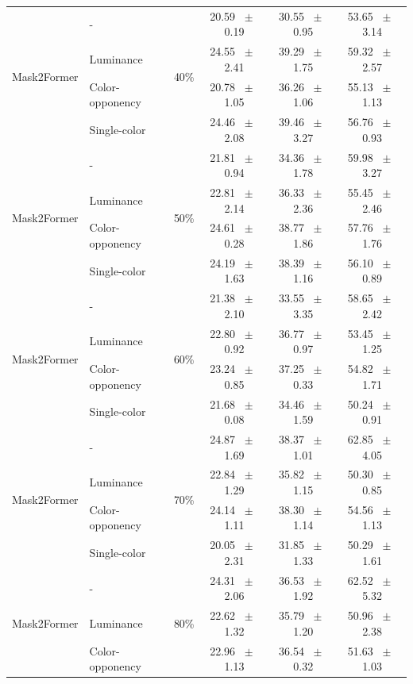 \begin{table}[h]
\begin{tabular}{@{}l l c c c c@{}}
    \multirow{4}{*}{Mask2Former} & - & \multirow{4}{*}{40\%} & 20.59 ~$\pm$~ 0.19 & 30.55 ~$\pm$~ 0.95 & 53.65 ~$\pm$~ 3.14 \\
    & Luminance &  & 24.55 ~$\pm$~ 2.41 & 39.29 ~$\pm$~ 1.75 & 59.32 ~$\pm$~ 2.57 \\
    & Color-opponency &  & 20.78 ~$\pm$~ 1.05 & 36.26 ~$\pm$~ 1.06 & 55.13 ~$\pm$~ 1.13 \\
    & Single-color &  & 24.46 ~$\pm$~ 2.08 & 39.46 ~$\pm$~ 3.27 & 56.76 ~$\pm$~ 0.93 \\
    \midrule
    \multirow{4}{*}{Mask2Former} & - & \multirow{4}{*}{50\%} & 21.81 ~$\pm$~ 0.94 & 34.36 ~$\pm$~ 1.78 & 59.98 ~$\pm$~ 3.27 \\
    & Luminance &  & 22.81 ~$\pm$~ 2.14 & 36.33 ~$\pm$~ 2.36 & 55.45 ~$\pm$~ 2.46 \\
    & Color-opponency &  & 24.61 ~$\pm$~ 0.28 & 38.77 ~$\pm$~ 1.86 & 57.76 ~$\pm$~ 1.76 \\
    & Single-color &  & 24.19 ~$\pm$~ 1.63 & 38.39 ~$\pm$~ 1.16 & 56.10 ~$\pm$~ 0.89 \\
    \midrule
    \multirow{4}{*}{Mask2Former} & - & \multirow{4}{*}{60\%} & 21.38 ~$\pm$~ 2.10 & 33.55 ~$\pm$~ 3.35 & 58.65 ~$\pm$~ 2.42 \\
    & Luminance &  & 22.80 ~$\pm$~ 0.92 & 36.77 ~$\pm$~ 0.97 & 53.45 ~$\pm$~ 1.25 \\
    & Color-opponency &  & 23.24 ~$\pm$~ 0.85 & 37.25 ~$\pm$~ 0.33 & 54.82 ~$\pm$~ 1.71 \\
    & Single-color &  & 21.68 ~$\pm$~ 0.08 & 34.46 ~$\pm$~ 1.59 & 50.24 ~$\pm$~ 0.91 \\
    \midrule
    \multirow{4}{*}{Mask2Former} & - & \multirow{4}{*}{70\%} & 24.87 ~$\pm$~ 1.69 & 38.37 ~$\pm$~ 1.01 & 62.85 ~$\pm$~ 4.05 \\
    & Luminance &  & 22.84 ~$\pm$~ 1.29 & 35.82 ~$\pm$~ 1.15 & 50.30 ~$\pm$~ 0.85 \\
    & Color-opponency &  & 24.14 ~$\pm$~ 1.11 & 38.30 ~$\pm$~ 1.14 & 54.56 ~$\pm$~ 1.13 \\
    & Single-color &  & 20.05 ~$\pm$~ 2.31 & 31.85 ~$\pm$~ 1.33 & 50.29 ~$\pm$~ 1.61 \\
    \midrule
    \multirow{4}{*}{Mask2Former} & - & \multirow{4}{*}{80\%} & 24.31 ~$\pm$~ 2.06 & 36.53 ~$\pm$~ 1.92 & 62.52 ~$\pm$~ 5.32 \\
    & Luminance &  & 22.62 ~$\pm$~ 1.32 & 35.79 ~$\pm$~ 1.20 & 50.96 ~$\pm$~ 2.38 \\
    & Color-opponency &  & 22.96 ~$\pm$~ 1.13 & 36.54 ~$\pm$~ 0.32 & 51.63 ~$\pm$~ 1.03 \\

\end{tabular}
\end{table}
